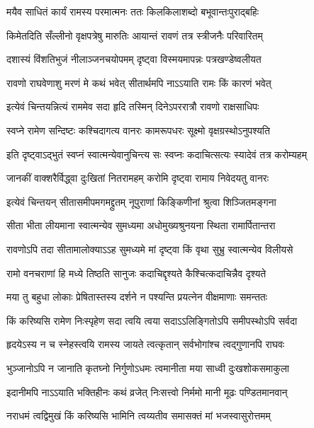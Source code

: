 \twolineshloka
{मयैव साधितं कार्यं रामस्य परमात्मनः}
{ततः किलकिलाशब्दो बभूवान्तःपुराद्बहिः} %

\twolineshloka
{किमेतदिति सँल्लीनो वृक्षपत्रेषु मारुतिः}
{आयान्तं रावणं तत्र स्त्रीजनैः परिवारितम्} %

\twolineshloka
{दशास्यं विंशतिभुजं नीलाञ्जनचयोपमम्}
{दृष्ट्वा विस्मयमापन्नः पत्रखण्डेष्वलीयत} %

\twolineshloka
{रावणो राघवेणाशु मरणं मे कथं भवेत्}
{सीतार्थमपि नाऽऽयाति रामः किं कारणं भवेत्} %

\twolineshloka
{इत्येवं चिन्तयन्नित्यं राममेव सदा हृदि}
{तस्मिन् दिनेऽपररात्रौ रावणो राक्षसाधिपः} %

\twolineshloka
{स्वप्ने रामेण सन्दिष्टः कश्चिदागत्य वानरः}
{कामरूपधरः सूक्ष्मो वृक्षग्रस्थोऽनुपश्यति} %

\twolineshloka
{इति दृष्ट्वाऽद्भुतं स्वप्नं स्वात्मन्येवानुचिन्त्य सः}
{स्वप्नः कदाचित्सत्यः स्यादेवं तत्र करोम्यहम्} %

\twolineshloka
{जानकीं वाक्शरैर्विद्ध्वा दुःखितां नितरामहम्}
{करोमि दृष्ट्वा रामाय निवेदयतु वानरः} %

\twolineshloka
{इत्येवं चिन्तयन् सीतासमीपमगमद्द्रुतम्}
{नूपुराणां किङ्किणीनां श्रुत्वा शिञ्जितमङ्गना} %

\twolineshloka
{सीता भीता लीयमाना स्वात्मन्येव सुमध्यमा}
{अधोमुख्यश्रुनयना स्थिता रामार्पितान्तरा} %

\twolineshloka
{रावणोऽपि तदा सीतामालोक्याऽऽह सुमध्यमे}
{मां दृष्ट्वा किं वृथा सुभ्रु स्वात्मन्येव विलीयसे} %

\twolineshloka
{रामो वनचराणां हि मध्ये तिष्ठति सानुजः}
{कदाचिद्दृश्यते कैश्चित्कदाचिन्नैव दृश्यते} %

\twolineshloka
{मया तु बहुधा लोकाः प्रेषितास्तस्य दर्शने}
{न पश्यन्ति प्रयत्नेन वीक्षमाणाः समन्ततः} %

\twolineshloka
{किं करिष्यसि रामेण निःस्पृहेण सदा त्वयि}
{त्वया सदाऽऽलिङ्गितोऽपि समीपस्थोऽपि सर्वदा} %

\twolineshloka
{हृदयेऽस्य न च स्नेहस्त्वयि रामस्य जायते}
{त्वत्कृतान् सर्वभोगांश्च त्वद्गुणानपि राघवः} %

\twolineshloka
{भुञ्जानोऽपि न जानाति कृतघ्नो निर्गुणोऽधमः}
{त्वमानीता मया साध्वी दुःखशोकसमाकुला} %

\twolineshloka
{इदानीमपि नाऽऽयाति भक्तिहीनः कथं व्रजेत्}
{निःसत्त्वो निर्ममो मानी मूढः पण्डितमानवान्} %

\twolineshloka
{नराधमं त्वद्विमुखं किं करिष्यसि भामिनि}
{त्वय्यतीव समासक्तं मां भजस्वासुरोत्तमम्} %

